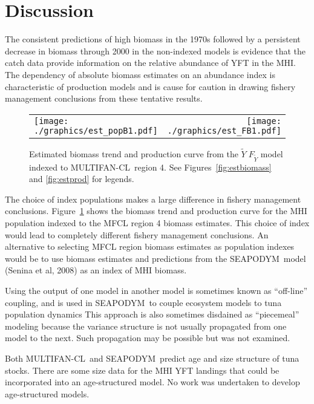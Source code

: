 \documentclass[12pt,letterpaper,twoside]{article}
\newcommand\SD{SEAPODYM}
\newcommand\MFCL{MULTIFAN-CL}
\newcommand\help[1]{\color{Magenta}{\it #1}\normalcolor}
\newcommand\MSY{\widetilde{Y}}
\newcommand\Fmsy{F_{\MSY}}
\newcommand\MSYFmsy{\MSY\;\Fmsy}
\begin{document}
\section{Discussion}
The consistent predictions of high biomass in the 1970s followed by a
persistent decrease in biomass through 2000 in the non-indexed models
is evidence that the catch data provide information on
the relative abundance of YFT in the MHI. The dependency of absolute
biomass estimates on an abundance index is characteristic of
production models \help{(references)} and is cause for caution
in drawing fishery management conclusions from these tentative results. 

\begin{figure}[h]
\begin{center}
\begin{tabular}{lr}
\texttt{[image: ./graphics/est\_popB1.pdf]}&
\texttt{[image: ./graphics/est\_FB1.pdf]}\\
\end{tabular}
\end{center}
\caption{\label{fig:estr4}
Estimated biomass trend and production curve from the $\MSYFmsy$
model indexed to \MFCL\ region 4. 
See Figures~\ref{fig:estbiomass} and \ref{fig:estprod} for legends.
}
\end{figure}

The choice of index populations makes a large difference in fishery management
conclusions. Figure~\ref{fig:estr4} shows the biomass trend and
production curve for the MHI population indexed to the MFCL region 4
biomass estimates. This choice of index would lead to completely
different fishery management conclusions.
An alternative to selecting MFCL region
biomass estimates as population indexes would be to use
biomass estimates and predictions from the \SD\ model (Senina et al,
2008) as an index of MHI biomass.

Using the output of one model in another model is sometimes known as
``off-line'' coupling, and is used in \SD\ to couple
ecosystem models to tuna population dynamics
This approach is also sometimes disdained as ``piecemeal''
modeling because the variance structure is not usually propagated from
one model to the next. Such propagation may be possible but was not
examined.

Both \MFCL\ and \SD\ predict age and size structure of tuna stocks.
There are some size data for the MHI YFT landings that could be
incorporated into an age-structured model. No work was undertaken to
develop age-structured models.
\end{document}
